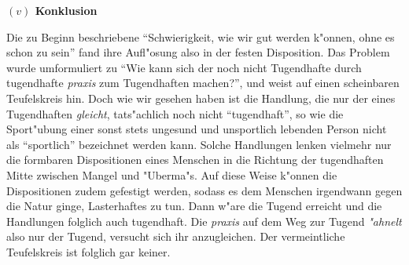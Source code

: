 \documentclass[a4paper, emulatestandardclasses, 12pt]{scrartcl}
\begin{document}
\begin{onehalfspace}
\vspace{5mm}
\noindent\textbf{$(v)$ Konklusion}	

\noindent Die zu Beginn beschriebene "`Schwierigkeit, wie wir gut werden k"onnen, ohne es schon zu sein"' fand ihre Aufl"osung also in der festen Disposition. Das Problem wurde umformuliert zu "`Wie kann sich der noch nicht Tugendhafte durch tugendhafte \emph{praxis} zum Tugendhaften machen?"', und weist auf einen scheinbaren Teufelskreis hin. Doch wie wir gesehen haben ist die Handlung, die nur der eines Tugendhaften \emph{gleicht}, tats"achlich noch nicht "`tugendhaft"', so wie die Sport"ubung einer sonst stets ungesund und unsportlich lebenden Person nicht als "`sportlich"' bezeichnet werden kann. Solche Handlungen lenken vielmehr nur die formbaren Dispositionen eines Menschen in die Richtung der tugendhaften Mitte zwischen Mangel und "Uberma"s. Auf diese Weise k"onnen die Dispositionen zudem gefestigt werden, sodass es dem Menschen irgendwann gegen die Natur ginge, Lasterhaftes zu tun. Dann w"are die Tugend erreicht und die Handlungen folglich auch tugendhaft. Die \emph{praxis} auf dem Weg zur Tugend \emph{"ahnelt} also nur der Tugend, versucht sich ihr anzugleichen. Der vermeintliche Teufelskreis ist folglich gar keiner.

\end{onehalfspace}
\nocite{*}

\end{document}
